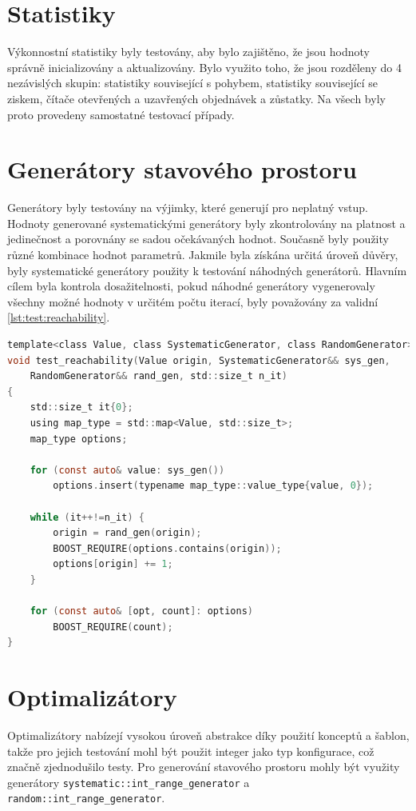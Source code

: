 \section{Statistiky}
Výkonnostní statistiky byly testovány, aby bylo zajištěno, že jsou hodnoty správně inicializovány a aktualizovány.
Bylo využito toho, že jsou rozděleny do 4 nezávislých skupin: statistiky související s pohybem, statistiky související se ziskem, čítače otevřených a uzavřených objednávek a zůstatky.
Na všech byly proto provedeny samostatné testovací případy.

\section{Generátory stavového prostoru}
Generátory byly testovány na výjimky, které generují pro neplatný vstup.
Hodnoty generované systematickými generátory byly zkontrolovány na platnost a jedinečnost a porovnány se sadou očekávaných hodnot.
Současně byly použity různé kombinace hodnot parametrů.
Jakmile byla získána určitá úroveň důvěry, byly systematické generátory použity k testování náhodných generátorů.
Hlavním cílem byla kontrola dosažitelnosti, pokud náhodné generátory vygenerovaly všechny možné hodnoty v určitém počtu iterací, byly považovány za validní \ref{lst:test:reachability}.

\begin{lstlisting}[caption={~Testování dosažitelnosti stavů},label={lst:test:reachability},captionpos=t,abovecaptionskip=-\medskipamount,belowcaptionskip=\medskipamount,language=C]
template<class Value, class SystematicGenerator, class RandomGenerator>
void test_reachability(Value origin, SystematicGenerator&& sys_gen,
    RandomGenerator&& rand_gen, std::size_t n_it)
{
    std::size_t it{0};
    using map_type = std::map<Value, std::size_t>;
    map_type options;

    for (const auto& value: sys_gen())
        options.insert(typename map_type::value_type{value, 0});

    while (it++!=n_it) {
        origin = rand_gen(origin);
        BOOST_REQUIRE(options.contains(origin));
        options[origin] += 1;
    }

    for (const auto& [opt, count]: options)
        BOOST_REQUIRE(count);
}
\end{lstlisting}

\section{Optimalizátory}
Optimalizátory nabízejí vysokou úroveň abstrakce díky použití konceptů a šablon, takže pro jejich testování mohl být použit integer jako typ konfigurace, což značně zjednodušilo testy.
Pro generování stavového prostoru mohly být využity generátory  \texttt{systematic::int\_range\_generator} a \texttt{random::int\_range\_generator}.

